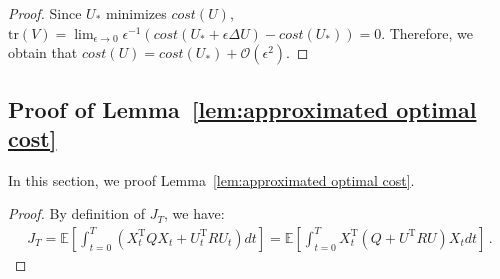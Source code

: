 \documentclass{article}
\theoremstyle{definition}
\begin{document}
\begin{proof}
Since $U_{*}$ minimizes $cost(U)$, $\mathrm{tr}(V)=\lim_{\epsilon\to 0} \epsilon^{-1}(cost(U_{*}+\epsilon\Delta U)-cost(U_{*}))= 0$. Therefore, we obtain that $cost(U)=cost(U_{*})+\mathcal{O}(\epsilon^{2})$.

\end{proof}


\subsection{Proof of Lemma~\ref{lem:approximated optimal cost}}
In this section, we proof Lemma~\ref{lem:approximated optimal cost}.
\approximated*

\begin{proof}
    By definition of $J_{T}$, we have:
\begin{align*}
J_{T}=\mathbb{E}\left[\int_{t=0}^{T}\left(X^{\mathrm{T}}_{t}QX_{t}+U_{t}^{\mathrm{T}}RU_{t}\right)dt\right]=\mathbb{E}\left[\int_{t=0}^{T}X^{\mathrm{T}}_{t}(Q+U^{\mathrm{T}}RU)X_{t}dt\right]\,.
\end{align*}


\end{proof}
\end{document}

